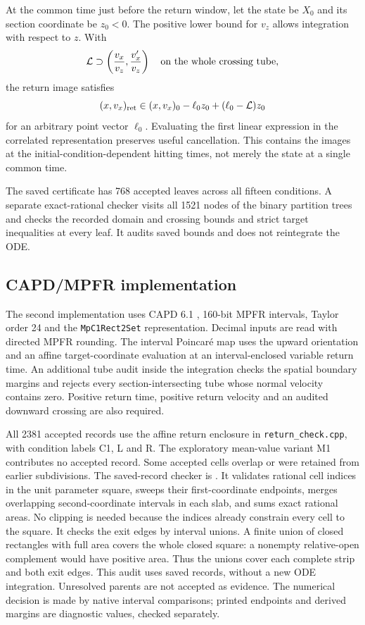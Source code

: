 At the common time just before the return window, let the state be $X_0$
and its section coordinate be $z_0<0$. The positive lower bound for $v_z$
allows integration with respect to $z$. With
\[
 \mathcal L\supset\left(\frac{v_x}{v_z},\frac{v'_x}{v_z}\right)
 \quad\hbox{on the whole crossing tube},
\]
the return image satisfies
\[
 (x,v_x)_{\rm ret}\in(x,v_x)_0-\ell_0z_0+(\ell_0-\mathcal L)z_0
\]
for an arbitrary point vector $\ell_0$. Evaluating the first linear expression
in the correlated representation preserves useful cancellation. This
contains the images at the initial-condition-dependent hitting times, not
merely the state at a single common time.

The saved certificate has 768 accepted leaves across all fifteen conditions.
A separate exact-rational checker visits all 1521 nodes of the binary
partition trees and checks the recorded domain and crossing bounds and
strict target inequalities at every leaf. It audits saved bounds and does
not reintegrate the ODE.

\subsection{CAPD/MPFR implementation}

The second implementation uses CAPD 6.1 \cite{CAPD}, 160-bit MPFR intervals,
Taylor order 24 and the \texttt{MpC1Rect2Set} representation. Decimal inputs
are read with directed MPFR rounding. The interval Poincar\'e map uses the
upward orientation and an affine target-coordinate evaluation at an
interval-enclosed variable return time. An additional tube audit inside the
integration checks the
spatial boundary margins and rejects every section-intersecting tube whose
normal velocity contains zero. Positive return time, positive return
velocity and an audited downward crossing are also required.

All 2381 accepted records use the affine return enclosure in
\texttt{return\_check.cpp}, with condition labels C1, L and R. The
exploratory mean-value variant M1 contributes no accepted record.
Some accepted cells overlap or were retained from earlier subdivisions.
The saved-record checker is
.
It validates rational cell indices in the unit parameter square, sweeps
their first-coordinate endpoints, merges overlapping second-coordinate
intervals in each slab, and sums exact rational areas. No clipping is
needed because the indices already constrain every cell to the square.
It checks the exit edges by interval unions. A finite union of closed
rectangles with full area covers the whole closed square: a nonempty
relative-open complement would have positive area. Thus the unions cover
each complete strip and both exit edges. This audit uses saved records,
without a new ODE integration. Unresolved parents are not accepted as evidence.
The numerical decision is made by native interval comparisons; printed
endpoints and derived margins are diagnostic values, checked separately.

